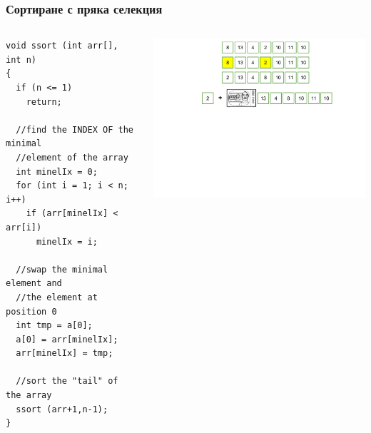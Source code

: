 \documentclass{beamer}
\begin{document}
\begin{frame}[fragile]
\frametitle{Сортиране с пряка селекция}



\begin{columns}[t]
  \begin{column}{0.5\textwidth}

\begin{lstlisting}
void ssort (int arr[], int n)
{
  if (n <= 1)
    return;

  //find the INDEX OF the minimal
  //element of the array
  int minelIx = 0;
  for (int i = 1; i < n; i++)
    if (arr[minelIx] < arr[i])
      minelIx = i;

  //swap the minimal element and
  //the element at position 0
  int tmp = a[0];
  a[0] = arr[minelIx];
  arr[minelIx] = tmp;

  //sort the "tail" of the array
  ssort (arr+1,n-1);
}
\end{lstlisting}


  \end{column}
  \begin{column}{0.5\textwidth}
\vspace*{-1pt}
\hspace*{-70pt}
\includegraphics[width=10cm]{images/ssort_rec}

  \end{column}
\end{columns}

\end{frame}
\end{document}
